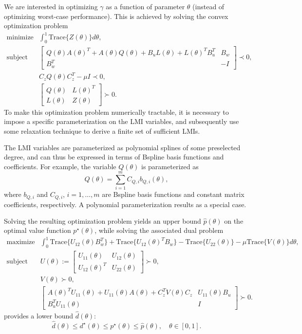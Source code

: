 \documentclass{article}
\newcommand{\opt}{\star}                    %
\newcommand{\ppar}{\theta}                          %
\begin{document}
We are interested in optimizing $\gamma$ as a function of parameter $\ppar$ (instead of optimizing worst-case performance). This is achieved by solving the convex optimization problem
\begin{eqnarray*}
 \text{minimize} & \int_0^1 \text{Trace}\{Z(\ppar)\} d\ppar, \\
 \text{subject to} & \left[ \begin{array}{cc} Q(\ppar)A(\ppar)^T + A(\ppar)Q(\ppar) + B_u L(\ppar) + L(\ppar)^T B_u^T & B_w \\ B_w^T & -I \end{array} \right] \prec 0, \\
 & C_z Q(\ppar) C_z^T - \mu I \prec 0, \\
 & \left[ \begin{array}{cc} Q(\ppar) & L(\ppar)^T \\ L(\ppar) & Z(\ppar) \end{array} \right] \succ 0.
\end{eqnarray*}
To make this optimization problem numerically tractable, it is necessary to impose a specific parameterization on the LMI variables, and subsequently use some relaxation technique to derive a finite set of sufficient LMIs.

The LMI variables are parameterized as polynomial splines of some preselected degree, and can thus be expressed in terms of Bspline basis functions and coefficients. For example, the variable $Q(\ppar)$ is parameterized as
\begin{equation*}
	Q(\ppar) = \sum_{i=1}^m C_{Q,i} b_{Q,i}(\ppar),
\end{equation*}
where $b_{Q,i}$ and $C_{Q,i}$, $i = 1,\dots,m$ are Bspline basis functions and constant matrix coefficients, respectively. A polynomial parameterization results as a special case.

Solving the resulting optimization problem yields an upper bound $\hat{p}(\ppar)$ on the optimal value function $p^\opt(\ppar)$, while solving the associated dual problem
\begin{eqnarray*}
 \text{maximize} & \int_0^1 \text{Trace}\{U_{12}(\ppar)B_w^T\} + \text{Trace}\{U_{12}(\ppar)^T B_w\} - \text{Trace}\{U_{22}(\ppar)\} - \mu \text{Trace}\{V(\ppar)\}d\ppar, \\
 \text{subject to} & U(\ppar) := \left[ \begin{array}{cc} U_{11}(\ppar) & U_{12}(\ppar) \\ U_{12}(\ppar)^T & U_{22}(\ppar) \end{array} \right] \succ 0, \\
 & V(\ppar) \succ 0, \\
 & \left[ \begin{array}{cc} A(\ppar)^T U_{11}(\ppar) + U_{11}(\ppar)A(\ppar) + C_z^T V(\ppar) C_z & U_{11}(\ppar)B_u \\ B_u^T U_{11}(\ppar) & I \end{array} \right] \succ 0.
\end{eqnarray*}
provides a lower bound $\hat{d}(\ppar)$:
\begin{equation*}
 \hat{d}(\ppar) \leq d^{\opt}(\ppar) \leq p^{\opt}(\ppar) \leq \hat{p}(\ppar), \quad \ppar \in [0,1].
\end{equation*}
\end{document}
